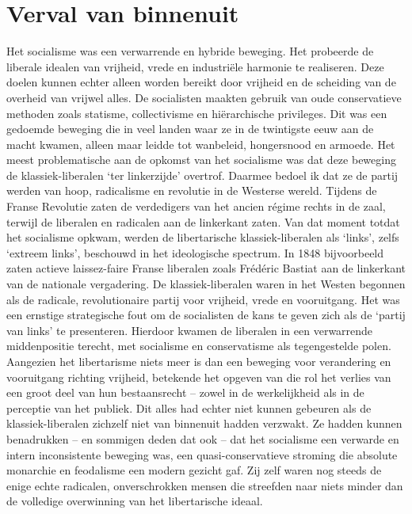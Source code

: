 \documentclass[
  a5paper,
  smalldemyvopaper,10pt,twoside,onecolumn,openright,extrafontsizes,hidelinks]{memoir}
\begin{document}
\section{Verval van binnenuit}\label{verval-van-binnenuit}

Het socialisme was een verwarrende en hybride beweging. Het probeerde de
liberale idealen van vrijheid, vrede en industriële harmonie te
realiseren. Deze doelen kunnen echter alleen worden bereikt door
vrijheid en de scheiding van de overheid van vrijwel alles. De
socialisten maakten gebruik van oude conservatieve methoden zoals
statisme, collectivisme en hiërarchische privileges. Dit was een
gedoemde beweging die in veel landen waar ze in de twintigste eeuw aan
de macht kwamen, alleen maar leidde tot wanbeleid, hongersnood en
armoede. Het meest problematische aan de opkomst van het socialisme was
dat deze beweging de klassiek-liberalen `ter linkerzijde' overtrof.
Daarmee bedoel ik dat ze de partij werden van hoop, radicalisme en
revolutie in de Westerse wereld. Tijdens de Franse Revolutie zaten de
verdedigers van het ancien régime rechts in de zaal, terwijl de
liberalen en radicalen aan de linkerkant zaten. Van dat moment totdat
het socialisme opkwam, werden de libertarische klassiek-liberalen als
`links', zelfs `extreem links', beschouwd in het ideologische spectrum.
In 1848 bijvoorbeeld zaten actieve laissez-faire Franse liberalen zoals
Frédéric Bastiat aan de linkerkant van de nationale vergadering. De
klassiek-liberalen waren in het Westen begonnen als de radicale,
revolutionaire partij voor vrijheid, vrede en vooruitgang. Het was een
ernstige strategische fout om de socialisten de kans te geven zich als
de `partij van links' te presenteren. Hierdoor kwamen de liberalen in
een verwarrende middenpositie terecht, met socialisme en conservatisme
als tegengestelde polen. Aangezien het libertarisme niets meer is dan
een beweging voor verandering en vooruitgang richting vrijheid,
betekende het opgeven van die rol het verlies van een groot deel van hun
bestaansrecht -- zowel in de werkelijkheid als in de perceptie van het
publiek. Dit alles had echter niet kunnen gebeuren als de
klassiek-liberalen zichzelf niet van binnenuit hadden verzwakt. Ze
hadden kunnen benadrukken -- en sommigen deden dat ook -- dat het
socialisme een verwarde en intern inconsistente beweging was, een
quasi-conservatieve stroming die absolute monarchie en feodalisme een
modern gezicht gaf. Zij zelf waren nog steeds de enige echte radicalen,
onverschrokken mensen die streefden naar niets minder dan de volledige
overwinning van het libertarische ideaal.
\end{document}
